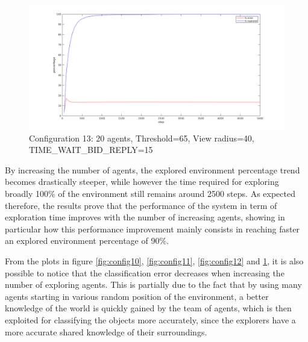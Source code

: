 \documentclass[a4paper, 10pt, conference]{ieeeconf}      %
\begin{document}
\begin{figure}[H]
	\centering
	\includegraphics[width=1\linewidth]{img/config13.png}
	\caption{Configuration 13: 20 agents, Threshold=65, View radius=40, TIME\_WAIT\_BID\_REPLY=15}
	\label{fig:config13}
\end{figure}

By increasing the number of agents, the explored environment percentage trend becomes drastically steeper, while however the time required for exploring broadly 100\% of the environment still remains around 2500 steps. As expected therefore, the results prove that the performance of the system in term of exploration time improves with the number of increasing agents, showing in particular how this performance improvement mainly consists in reaching faster an explored environment percentage of 90\%. 

From the plots in figure \ref{fig:config10}, \ref{fig:config11}, \ref{fig:config12} and \ref{fig:config13}, it is also possible to notice that the classification error decreases when increasing the number of exploring agents. This is partially due to the fact that by using many agents starting in various random position of the environment, a better knowledge of the world is quickly gained by the team of agents, which is then exploited for classifying the objects more accurately, since the explorers have a more accurate shared knowledge of their surroundings. 
\end{document}
